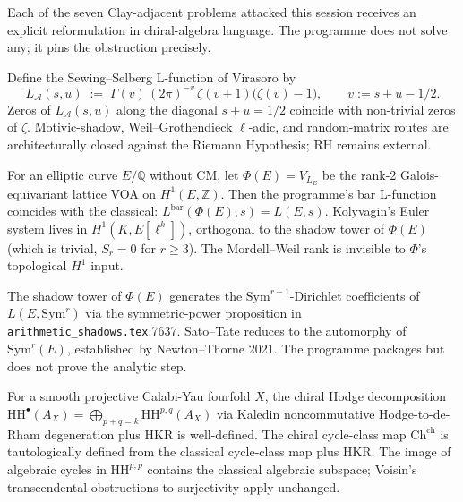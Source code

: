 \documentclass[11pt]{article}
\begin{document}
Each of the seven Clay-adjacent problems attacked this session receives
an explicit reformulation in chiral-algebra language. The programme
does not solve any; it pins the obstruction precisely.

\begin{proposition}
\label{prop:rh-reformulated}
Define the Sewing--Selberg L-function of Virasoro by
\[
  L_{\mathcal{A}}(s, u) \;:=\; \Gamma(v)\,(2\pi)^{-v}\,\zeta(v + 1)\bigl(\zeta(v) - 1\bigr),
  \qquad v := s + u - 1/2.
\]
Zeros of $L_{\mathcal{A}}(s, u)$ along the diagonal $s + u = 1/2$
coincide with non-trivial zeros of $\zeta$. Motivic-shadow,
Weil--Grothendieck $\ell$-adic, and random-matrix routes are
architecturally closed against the Riemann Hypothesis; RH remains
external.
\end{proposition}

\begin{proposition}
\label{prop:bsd-reformulated}
For an elliptic curve $E / \mathbb{Q}$ without CM, let
$\Phi(E) = V_{L_E}$ be the rank-2 Galois-equivariant lattice VOA on
$H^1(E, \mathbb{Z})$. Then the programme's bar L-function coincides
with the classical: $L^{\mathrm{bar}}(\Phi(E), s) = L(E, s)$.
Kolyvagin's Euler system lives in $H^1(K, E[\ell^k])$, orthogonal
to the shadow tower of $\Phi(E)$ (which is trivial, $S_r = 0$ for
$r \ge 3$). The Mordell--Weil rank is invisible to $\Phi$'s
topological $H^1$ input.
\end{proposition}

\begin{proposition}
\label{prop:sato-tate-reformulated}
The shadow tower of $\Phi(E)$ generates the
$\mathrm{Sym}^{r-1}$-Dirichlet coefficients of $L(E, \mathrm{Sym}^r)$
via the symmetric-power proposition in
\texttt{arithmetic\_shadows.tex}:7637. Sato--Tate reduces to the
automorphy of $\mathrm{Sym}^r(E)$, established by Newton--Thorne 2021.
The programme packages but does not prove the analytic step.
\end{proposition}

\begin{proposition}
\label{prop:hodge-reformulated}
For a smooth projective Calabi-Yau fourfold $X$, the chiral Hodge
decomposition
$\mathrm{HH}^{\bullet}(A_X) = \bigoplus_{p+q = k} \mathrm{HH}^{p,q}(A_X)$
via Kaledin noncommutative Hodge-to-de-Rham degeneration plus HKR
is well-defined. The chiral cycle-class map $\mathrm{Ch}^{\mathrm{ch}}$
is tautologically defined from the classical cycle-class map plus HKR.
The image of algebraic cycles in $\mathrm{HH}^{p,p}$ contains the
classical algebraic subspace; Voisin's transcendental obstructions
to surjectivity apply unchanged.
\end{proposition}
\end{document}
